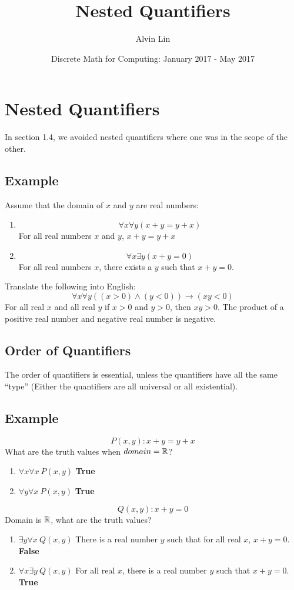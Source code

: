 \documentclass[letterpaper, 12pt]{math}
\title{Nested Quantifiers}
\author{Alvin Lin}
\date{Discrete Math for Computing: January 2017 - May 2017}
\begin{document}
\maketitle

\section*{Nested Quantifiers}
In section 1.4, we avoided nested quantifiers where one was in the scope of the
other.

\subsection*{Example}
Assume that the domain of \( x \) and \( y \) are real numbers:
\begin{enumerate}
  \item \[ \forall x \forall y (x+y = y+x) \]
  For all real numbers \( x \) and \( y \), \( x+y = y+x \)
  \item \[ \forall x \exists y (x+y = 0) \]
  For all real numbers \( x \), there exists a \( y \) such that \( x+y = 0 \).
\end{enumerate}
Translate the following into English:
\[ \forall x \forall y ((x > 0) \wedge (y < 0)) \to (xy < 0) \]
For all real \( x \) and all real \( y \) if \( x > 0 \) and \( y > 0 \), then
\( xy > 0 \). The product of a positive real number and negative real number is
negative.

\subsection*{Order of Quantifiers}
The order of quantifiers is essential, unless the quantifiers have all the same
``type'' (Either the quantifiers are all universal or all existential).

\subsection*{Example}
\[ P(x,y): x+y = y+x \]
What are the truth values when \( domain = \mathbb{R} \)?
\begin{enumerate}
  \item \( \forall{x}\forall{x}\ P(x,y) \) \textbf{True}
  \item \( \forall{y}\forall{x}\ P(x,y) \) \textbf{True}
\end{enumerate}
\[ Q(x,y): x+y = 0 \]
Domain is \( \mathbb{R} \), what are the truth values?
\begin{enumerate}
  \item \( \exists{y}\forall{x}\ Q(x,y) \) There is a real number \( y \) such
  that for all real \( x \), \( x+y = 0 \). \textbf{False}
  \item \( \forall{x}\exists{y}\ Q(x,y) \) For all real \( x \), there is a
  real number \( y \) such that \( x+y = 0 \). \textbf{True}
\end{enumerate}
\end{document}
